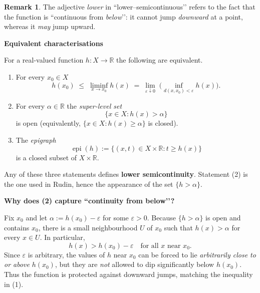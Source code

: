 \documentclass[12pt]{article}
\theoremstyle{definition} %
\newtheorem{remark}{Remark}
\theoremstyle{plain} %
\begin{document}
      \pagebreak
      \begin{remark}
        The adjective \emph{lower} in “lower–semicontinuous’’ refers to the fact
        that the function is “continuous from \emph{below}’’: it cannot jump
        \emph{downward} at a point, whereas it \emph{may} jump upward.
        
        \bigskip
        \textbf{Equivalent characterisations}
        
        For a real-valued function $h:X\to\mathbb{R}$ the following are
        equivalent.
        
        \begin{enumerate}
            \item For every $x_{0}\in X$
                  \[
                     h(x_{0})
                     \;\le\;
                     \liminf_{x\to x_{0}}h(x)
                     \;=\;
                     \lim_{\varepsilon\downarrow 0}\;
                     \bigl(\inf_{d(x,x_{0})<\varepsilon}h(x)\bigr).
                  \tag{1}
                  \]
        
            \item For every $\alpha\in\mathbb{R}$ the
                  \emph{super-level set}
                  \[
                      \{x\in X : h(x)>\alpha\}
                  \]
                  is open (equivalently,
                  $\{x\in X : h(x)\ge\alpha\}$ is closed).              
        
            \item The \emph{epigraph}
                  \[
                    \operatorname{epi}(h)
                    :=
                    \{(x,t)\in X\times\mathbb{R}: t\ge h(x)\}
                  \]
                  is a closed subset of $X\times\mathbb{R}$.            
        \end{enumerate}
        
        Any of these three statements defines \textbf{lower semicontinuity}.
        Statement (2) is the one used in Rudin, hence the appearance of the set
        $\{h>\alpha\}$.
        
        \bigskip
        \textbf{Why does (2) capture “continuity from below’’?}
        
        Fix $x_{0}$ and let $\alpha:=h(x_{0})-\varepsilon$ for some
        $\varepsilon>0$.  
        Because $\{h>\alpha\}$ is open and contains $x_{0}$, there is a small
        neighbourhood $U$ of $x_{0}$ such that $h(x)>\alpha$ for every
        $x\in U$.  In particular,
        \[
           h(x) > h(x_{0})-\varepsilon
           \quad\text{for all }x\text{ near }x_{0}.
        \]
        Since $\varepsilon$ is arbitrary, the values of $h$ near $x_{0}$ can be
        forced to lie \emph{arbitrarily close to or above} $h(x_{0})$, but they
        are \emph{not} allowed to dip significantly below $h(x_{0})$.  Thus the
        function is protected against downward jumps, matching the inequality in
        (1).
        

\end{remark}
\end{document}
